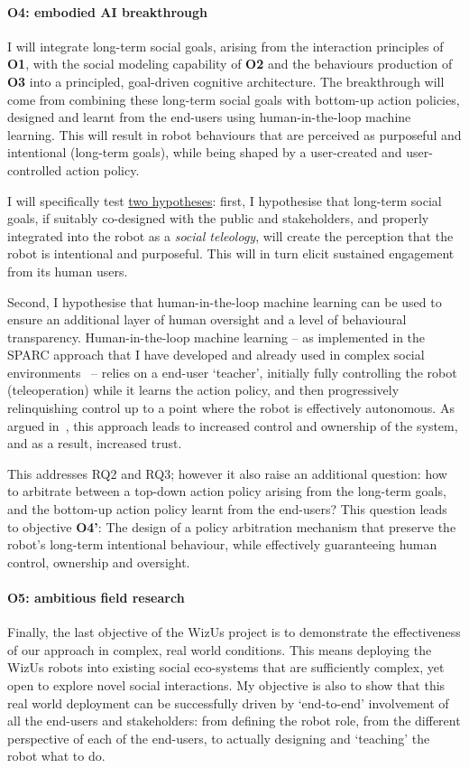 \documentclass[11pt,a4paper]{report}
\newcommand{\project}{WizUs\xspace}
\begin{document}
\paragraph{\bf O4: embodied AI breakthrough} I will integrate long-term social
goals, arising from the interaction principles of \textbf{O1}, with the social
modeling capability of \textbf{O2} and the behaviours production of \textbf{O3}
into a principled, goal-driven cognitive architecture. The breakthrough will
come from combining these long-term social goals with bottom-up action policies,
designed and learnt from the end-users using human-in-the-loop machine learning.
This will result in robot behaviours that are perceived as purposeful and
intentional (long-term goals), while being shaped by a
user-created and user-controlled action policy.

I will specifically test \ul{two hypotheses}: first, I hypothesise that long-term
social goals, if suitably co-designed with the public and stakeholders, and
properly integrated into the robot as a \emph{social teleology}, will create the
perception that the robot is intentional and purposeful. This will in turn
elicit sustained engagement from its human users.

Second, I hypothesise that human-in-the-loop machine learning can be used to
ensure an additional layer of human oversight and a level of behavioural
transparency.  Human-in-the-loop machine learning -- as implemented in the SPARC
approach that I have developed and already used in complex social
environments~\cite{senft2016sparc, senft2019teaching, winkle2020couch} -- relies
on a end-user `teacher', initially fully controlling the robot (teleoperation)
while it learns the action policy, and then progressively relinquishing control
up to a point where the robot is effectively autonomous. As argued
in~\cite{senft2019teaching}, this approach leads to increased control and
ownership of the system, and as a result, increased trust.

This addresses RQ2 and RQ3; however it also raise an additional question: how to
arbitrate between a top-down action policy arising from the long-term goals, and
the bottom-up action policy learnt from the end-users? This question leads to
objective {\bf O4'}: The design of a policy arbitration mechanism that preserve
the robot's long-term intentional behaviour, while effectively guaranteeing human
control, ownership and oversight.

\paragraph{\bf O5: ambitious field research} Finally, the last objective of the
\project project is to demonstrate the effectiveness of our approach in complex,
real world conditions. This means deploying the \project robots into existing
social eco-systems that are sufficiently complex, yet open to explore novel
social interactions. My objective is also to show that this real world
deployment can be successfully driven by `end-to-end' involvement of all the
end-users and stakeholders: from defining the robot role, from the different
perspective of each of the end-users, to actually designing and `teaching' the
robot what to do.
\end{document}
